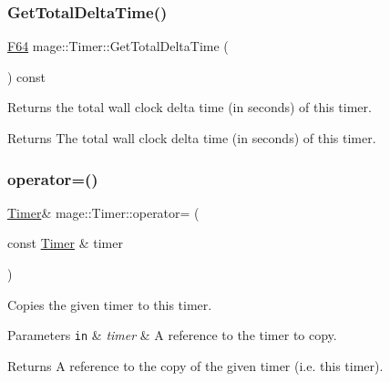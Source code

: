 \subsubsection{\texorpdfstring{Get\+Total\+Delta\+Time()}{GetTotalDeltaTime()}}
{\footnotesize\ttfamily \hyperlink{namespacemage_ad26233bbec640deda836e572c1a23708}{F64} mage\+::\+Timer\+::\+Get\+Total\+Delta\+Time (\begin{DoxyParamCaption}{ }\end{DoxyParamCaption}) const\hspace{0.3cm}{\ttfamily [noexcept]}}

Returns the total wall clock delta time (in seconds) of this timer.

\begin{DoxyReturn}{Returns}
The total wall clock delta time (in seconds) of this timer. 
\end{DoxyReturn}
\hypertarget{classmage_1_1_timer_ae83df63d5ff9eec370eddf208ac2077e}{}\label{classmage_1_1_timer_ae83df63d5ff9eec370eddf208ac2077e} 
\subsubsection{\texorpdfstring{operator=()}{operator=()}\hspace{0.1cm}{\footnotesize\ttfamily [1/2]}}
{\footnotesize\ttfamily \hyperlink{classmage_1_1_timer}{Timer}\& mage\+::\+Timer\+::operator= (\begin{DoxyParamCaption}\item[{const \hyperlink{classmage_1_1_timer}{Timer} \&}]{timer }\end{DoxyParamCaption})\hspace{0.3cm}{\ttfamily [default]}}

Copies the given timer to this timer.


\begin{DoxyParams}[1]{Parameters}
\mbox{\tt in}  & {\em timer} & A reference to the timer to copy. \\
\hline
\end{DoxyParams}
\begin{DoxyReturn}{Returns}
A reference to the copy of the given timer (i.\+e. this timer). 
\end{DoxyReturn}
\hypertarget{classmage_1_1_timer_a93f3a9d730bebd189af904568e5b7ecd}{}\label{classmage_1_1_timer_a93f3a9d730bebd189af904568e5b7ecd} 
